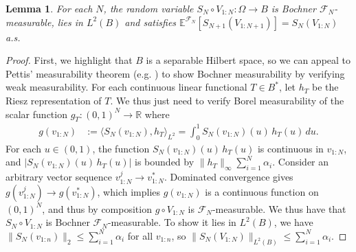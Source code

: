 \documentclass[11pt,a4paper]{article}
\newtheorem{lem}{Lemma}
\newcommand{\R}{\mathbb{R}}
\newcommand{\E}{\mathbb{E}}
\begin{document}
\begin{appendices}
\begin{lem}\label{app:lem_bochnerl2}
For each $N$, the random variable  $S_{N}\circ V_{1:N}:\Omega \to B$ is Bochner $\mathcal{F}_{N}$-measurable, lies in $L^2(B)$ and satisfies
$\E^{\mathcal{F}_{N}}[S_{N+1}(V_{1:N+1})] = S_{N}(V_{1:N})$ a.s.
\end{lem}
\begin{proof}
First, we highlight that $B$ is a separable Hilbert space, so we can appeal to Pettis' measurability theorem (e.g. \citet[Theorem 1.1.6]{Hytonen2016}) to show Bochner measurability by verifying weak measurability. For each continuous linear functional $T \in B^*$, let $h_T$ be the Riesz representation of $T$. We thus just need to verify Borel measurability of the scalar function $g_T: (0,1)^N \to \R$
 where
 \begin{align*}
    g(v_{1:N})  &:= \langle S_N(v_{1:N}), h_T \rangle_{L^2} = \int_0^1 S_N(v_{1:N})(u) \, h_T(u) \, du.
\end{align*}
For each $u \in (0,1)$, the function $S_N(v_{1:N})(u)\, h_T(u)$ is continuous in $v_{1:N}$, and $|S_N(v_{1:N})(u)\, h_T(u)|$ is bounded by $\|h_T\|_{\infty}\sum_{i = 1}^N \alpha_i$. Consider an arbitrary vector sequence $v^j_{1:N} \to v^*_{1:N}$.
Dominated convergence gives $g(v^j_{1:N}) \to g(v^*_{1:N})$, which
 implies $g(v_{1:N})$ is a continuous function on $(0,1)^N$,  and thus by composition $g \circ V_{1:N}$ is $\mathcal{F}_{N}$-measurable. We thus have that $S_N \circ V_{1:N}$ is Bochner $\mathcal{F}_N$-measurable. To show it lies in $L^2(B)$, we have $\|S_N(v_{1:n})\|_2\leq \sum_{i = 1}^N \alpha_i$ for all  $v_{1:n}$, so $ \|S_N(V_{1:N})\|_{L^2(B)}\leq \sum_{i = 1}^N \alpha_i$. 


\end{proof}
\end{appendices}
\end{document}
